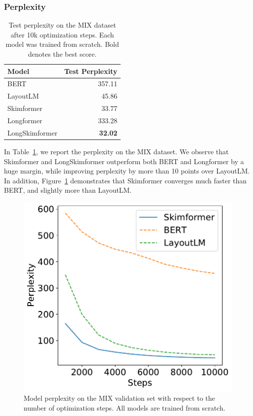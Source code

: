 \subsubsection{Perplexity}

\begin{table}
\centering \small
\begin{tabular}{lr}
    \hline
    \textbf{Model} & \textbf{Test Perplexity}\\
    \hline
    \ac{BERT} \citep{devlin2018bert} &  357.11 \\
    LayoutLM \citep{xu2020layoutlm}    & 45.86 \\
    Skimformer                         & 33.77 \\
    \midrule
    Longformer \citep{beltagy2020longformer} & 333.28 \\
    LongSkimformer                     & \textbf{32.02} \\
    \hline
\end{tabular}
\caption{Test perplexity on the MIX dataset after 10k optimization steps. Each model was trained from scratch. Bold denotes the best score.}
\label{tab:chapter3-ppl-mix}
\end{table}

In Table~\ref{tab:chapter3-ppl-mix}, we report the perplexity on the MIX dataset. We observe that Skimformer and LongSkimformer outperform both \ac{BERT} and Longformer by a huge margin, while improving perplexity by more than 10 points over LayoutLM. In addition, Figure~\ref{fig:chapter3-pretraining-learning-curves} demonstrates that Skimformer converges much faster than \ac{BERT}, and slightly more than LayoutLM.

\begin{figure}
    \centering \small
    \includegraphics[width=.4\textwidth]{images/chapter3/learning_curves-mix-steps10k-clean2.pdf}
    \caption{Model perplexity on the MIX validation set with respect to the number of optimization steps. All models are trained from scratch.}
    \label{fig:chapter3-pretraining-learning-curves}
\end{figure}

